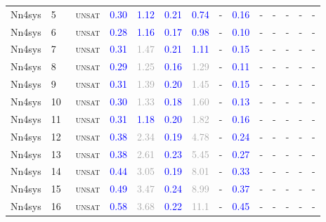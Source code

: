 \begin{center}
{\begin{longtable}{@{}llllllllllllll@{}}
Nn4sys & 5 & ~\textsc{unsat} & \textcolor{blue}{0.30} & \textcolor{blue}{1.12} & \textcolor{blue}{0.21} & \textcolor{blue}{0.74} & - & \textcolor{blue}{0.16} & - & - & - & - & - \\
Nn4sys & 6 & ~\textsc{unsat} & \textcolor{blue}{0.28} & \textcolor{blue}{1.16} & \textcolor{blue}{0.17} & \textcolor{blue}{0.98} & - & \textcolor{blue}{0.10} & - & - & - & - & - \\
Nn4sys & 7 & ~\textsc{unsat} & \textcolor{blue}{0.31} & \textcolor{darkgray}{1.47} & \textcolor{blue}{0.21} & \textcolor{blue}{1.11} & - & \textcolor{blue}{0.15} & - & - & - & - & - \\
Nn4sys & 8 & ~\textsc{unsat} & \textcolor{blue}{0.29} & \textcolor{darkgray}{1.25} & \textcolor{blue}{0.16} & \textcolor{darkgray}{1.29} & - & \textcolor{blue}{0.11} & - & - & - & - & - \\
Nn4sys & 9 & ~\textsc{unsat} & \textcolor{blue}{0.31} & \textcolor{darkgray}{1.39} & \textcolor{blue}{0.20} & \textcolor{darkgray}{1.45} & - & \textcolor{blue}{0.15} & - & - & - & - & - \\
Nn4sys & 10 & ~\textsc{unsat} & \textcolor{blue}{0.30} & \textcolor{darkgray}{1.33} & \textcolor{blue}{0.18} & \textcolor{darkgray}{1.60} & - & \textcolor{blue}{0.13} & - & - & - & - & - \\
Nn4sys & 11 & ~\textsc{unsat} & \textcolor{blue}{0.31} & \textcolor{blue}{1.18} & \textcolor{blue}{0.20} & \textcolor{darkgray}{1.82} & - & \textcolor{blue}{0.16} & - & - & - & - & - \\
Nn4sys & 12 & ~\textsc{unsat} & \textcolor{blue}{0.38} & \textcolor{darkgray}{2.34} & \textcolor{blue}{0.19} & \textcolor{darkgray}{4.78} & - & \textcolor{blue}{0.24} & - & - & - & - & - \\
Nn4sys & 13 & ~\textsc{unsat} & \textcolor{blue}{0.38} & \textcolor{darkgray}{2.61} & \textcolor{blue}{0.23} & \textcolor{darkgray}{5.45} & - & \textcolor{blue}{0.27} & - & - & - & - & - \\
Nn4sys & 14 & ~\textsc{unsat} & \textcolor{blue}{0.44} & \textcolor{darkgray}{3.05} & \textcolor{blue}{0.19} & \textcolor{darkgray}{8.01} & - & \textcolor{blue}{0.33} & - & - & - & - & - \\
Nn4sys & 15 & ~\textsc{unsat} & \textcolor{blue}{0.49} & \textcolor{darkgray}{3.47} & \textcolor{blue}{0.24} & \textcolor{darkgray}{8.99} & - & \textcolor{blue}{0.37} & - & - & - & - & - \\
Nn4sys & 16 & ~\textsc{unsat} & \textcolor{blue}{0.58} & \textcolor{darkgray}{3.68} & \textcolor{blue}{0.22} & \textcolor{darkgray}{11.1} & - & \textcolor{blue}{0.45} & - & - & - & - & - \\

\end{longtable}}
\end{center}
